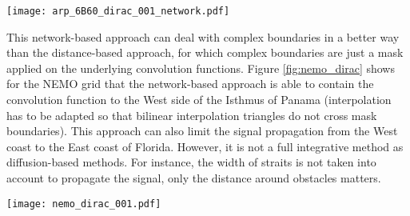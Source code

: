 \documentclass[12pt]{scrartcl}
\begin{document}
\begin{center}
\texttt{[image: arp\_6B60\_dirac\_001\_network.pdf]}
\end{center}

This network-based approach can deal with complex boundaries in a better way than the distance-based approach, for which complex boundaries are just a mask applied on the underlying convolution functions. Figure \ref{fig:nemo_dirac} shows for the NEMO grid that the network-based approach is able to contain the convolution function to the West side of the Isthmus of Panama (interpolation has to be adapted so that bilinear interpolation triangles do not cross mask boundaries). This approach can also limit the signal propagation from the West coast to the East coast of Florida. However, it is not a full integrative method as diffusion-based methods. For instance, the width of straits is not taken into account to propagate the signal, only the distance around obstacles matters.

\begin{center}
\texttt{[image: nemo\_dirac\_001.pdf]}
\end{center}
\end{document}
